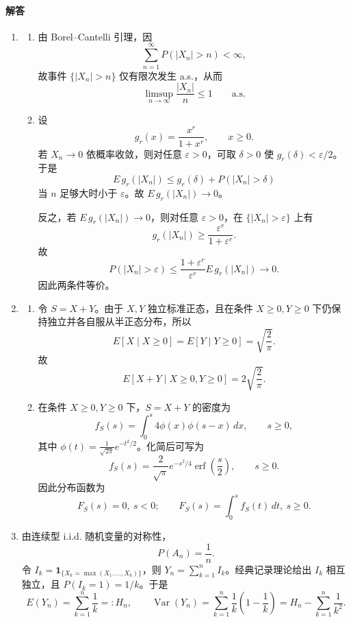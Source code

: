 \documentclass[UTF8,12pt]{ctexart}
\begin{document}
\paragraph{解答}
\begin{enumerate}[label=\textbf{\arabic*.},leftmargin=2.2em]
\item
\begin{enumerate}[label=\textbf{\arabic*)},leftmargin=2.4em]
\item 由 Borel--Cantelli 引理，因
\[
\sum_{n=1}^\infty P(|X_n|>n)<\infty,
\]
故事件 \(\{|X_n|>n\}\) 仅有限次发生 a.s.，从而
\[
\limsup_{n\to\infty}\frac{|X_n|}{n}\le1\qquad\text{a.s.}
\]

\item 设
\[
g_r(x)=\frac{x^r}{1+x^r},\qquad x\ge0.
\]
若 \(X_n\to0\) 依概率收敛，则对任意 \(\varepsilon>0\)，可取 \(\delta>0\) 使 \(g_r(\delta)<\varepsilon/2\)。于是
\[
E\,g_r(|X_n|)
\le g_r(\delta)+P(|X_n|>\delta)
\]
当 \(n\) 足够大时小于 \(\varepsilon\)。故 \(E\,g_r(|X_n|)\to0\)。

反之，若 \(E\,g_r(|X_n|)\to0\)，则对任意 \(\varepsilon>0\)，在 \(\{|X_n|>\varepsilon\}\) 上有
\[
g_r(|X_n|)\ge \frac{\varepsilon^r}{1+\varepsilon^r}.
\]
故
\[
P(|X_n|>\varepsilon)\le \frac{1+\varepsilon^r}{\varepsilon^r}E\,g_r(|X_n|)\to0.
\]
因此两条件等价。
\end{enumerate}

\item
\begin{enumerate}[label=\textbf{\arabic*)},leftmargin=2.4em]
\item 令 \(S=X+Y\)。由于 \(X,Y\) 独立标准正态，且在条件 \(X\ge0,Y\ge0\) 下仍保持独立并各自服从半正态分布，所以
\[
E[X\mid X\ge0]=E[Y\mid Y\ge0]=\sqrt{\frac2\pi}.
\]
故
\[
E[X+Y\mid X\ge0,Y\ge0]=2\sqrt{\frac2\pi}.
\]

\item 在条件 \(X\ge0,Y\ge0\) 下，\(S=X+Y\) 的密度为
\[
f_S(s)=\int_0^s 4\phi(x)\phi(s-x)\,dx,\qquad s\ge0,
\]
其中 \(\phi(t)=\frac1{\sqrt{2\pi}}e^{-t^2/2}\)。化简后可写为
\[
f_S(s)=\frac{2}{\sqrt\pi}e^{-s^2/4}\operatorname{erf}\!\left(\frac s2\right),\qquad s\ge0.
\]
因此分布函数为
\[
F_S(s)=0,\ s<0;\qquad F_S(s)=\int_0^s f_S(t)\,dt,\ s\ge0.
\]
\end{enumerate}

\item 由连续型 i.i.d. 随机变量的对称性，
\[
P(A_n)=\frac1n.
\]
令 \(I_k=\mathbf 1_{\{X_k=\max(X_1,\dots,X_k)\}}\)，则 \(Y_n=\sum_{k=1}^n I_k\)。经典记录理论给出 \(I_k\) 相互独立，且 \(P(I_k=1)=1/k\)。于是
\[
E(Y_n)=\sum_{k=1}^n \frac1k=:H_n,
\qquad
\operatorname{Var}(Y_n)=\sum_{k=1}^n \frac1k\left(1-\frac1k\right)
=H_n-\sum_{k=1}^n\frac1{k^2}.
\]


\end{enumerate}
\end{document}
